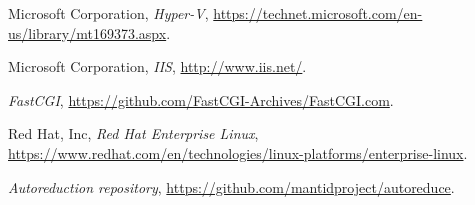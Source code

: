 \documentclass[twocolumn]{article}
\begin{document}
\begin{thebibliography}{99}
    Microsoft Corporation,
    \emph{Hyper-V},
    \url{https://technet.microsoft.com/en-us/library/mt169373.aspx}.
    
    Microsoft Corporation,
    \emph{IIS},
    \url{http://www.iis.net/}.
    
    \emph{FastCGI},
    \url{https://github.com/FastCGI-Archives/FastCGI.com}.
    
    Red Hat, Inc,
    \emph{Red Hat Enterprise Linux},
    \url{https://www.redhat.com/en/technologies/linux-platforms/enterprise-linux}.
    
    \emph{Autoreduction repository},
    \url{https://github.com/mantidproject/autoreduce}.

    
\end{thebibliography}
\end{document}
